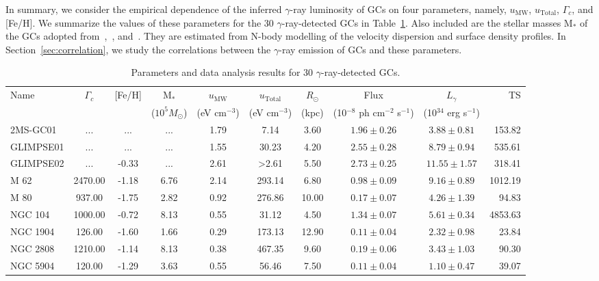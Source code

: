 \documentclass[doublespace,draft,nopageskip]{VTthesis} %
\begin{document}
In summary, we consider the empirical dependence of the inferred $\gamma$-ray luminosity of GCs on four parameters, namely, $u_\text{MW}$, $u_\text{Total}$, $\Gamma_c$, and [Fe/H]. We summarize the values of these parameters for the 30 $\gamma$-ray-detected GCs in Table~\ref{tab:pars}. Also included are the stellar masses M$_*$ of the GCs adopted from~\citet{2017MNRAS.464.2174B},~\cite{2017MNRAS.471.3668S}, and~\citet{2018MNRAS.478.1520B}. They are estimated from N-body modelling of the velocity dispersion and surface density profiles. In Section~\ref{sec:correlation}, we study the correlations between the $\gamma$-ray emission of GCs and these parameters.

\begin{table}
\centering
\caption{Parameters and data analysis results for 30 $\gamma$-ray-detected GCs.}\label{tab:pars}
\begin{threeparttable}
\begin{tabular}{lccccccccr}
\hline
Name &  $\Gamma_c$\tnote{a} & [Fe/H]\tnote{b}  & M$_*$\tnote{c} & $u_\text{MW}$\tnote{d} & $u_\text{Total}$\tnote{e} & $R_\odot$\tnote{f} & Flux\tnote{g} & $L_\gamma$\tnote{g} & TS\tnote{h}\\
 & &  & ($10^5 M_\odot$) & (eV cm$^{-3}$) & (eV cm$^{-3}$) & (kpc) & (10$^{-8}$ ph cm$^{-2}$ s$^{-1}$)  & (10$^{34}$ erg s$^{-1}$)\\
\hline
2MS-GC01 & ... & ... & ... & 1.79 & 7.14 & 3.60 & $1.96 \pm 0.26$ & $3.88 \pm 0.81$ & 153.82\\
GLIMPSE01 & ... & ... & ... & 1.55 & 30.23 & 4.20 & $2.55 \pm 0.28$ & $8.79 \pm 0.94$ & 535.61\\
GLIMPSE02 & ... & -0.33 & ... & 2.61 & >2.61 & 5.50 & $2.73 \pm 0.25$ & $11.55 \pm 1.57$ & 318.41\\
M 62 & 2470.00 & -1.18 & 6.76 & 2.14 & 293.14 & 6.80 & $0.98 \pm 0.09$ & $9.16 \pm 0.89$ & 1012.19\\
M 80 & 937.00 & -1.75 & 2.82 & 0.92 & 276.86 & 10.00 & $0.17 \pm 0.07$ & $4.26 \pm 1.39$ & 94.83\\
NGC 104 & 1000.00 & -0.72 & 8.13 & 0.55 & 31.12 & 4.50 & $1.34 \pm 0.07$ & $5.61 \pm 0.34$ & 4853.63\\
NGC 1904 & 126.00 & -1.60 & 1.66 & 0.29 & 173.13 & 12.90 & $0.11 \pm 0.04$ & $2.32 \pm 0.98$ & 23.84\\
NGC 2808 & 1210.00 & -1.14 & 8.13 & 0.38 & 467.35 & 9.60 & $0.19 \pm 0.06$ & $3.43 \pm 1.03$ & 90.30\\
NGC 5904 & 120.00 & -1.29 & 3.63 & 0.55 & 56.46 & 7.50 & $0.11 \pm 0.04$ & $1.10 \pm 0.47$ & 39.07\\

\end{tabular}
\end{threeparttable}
\end{table}
\end{document}

